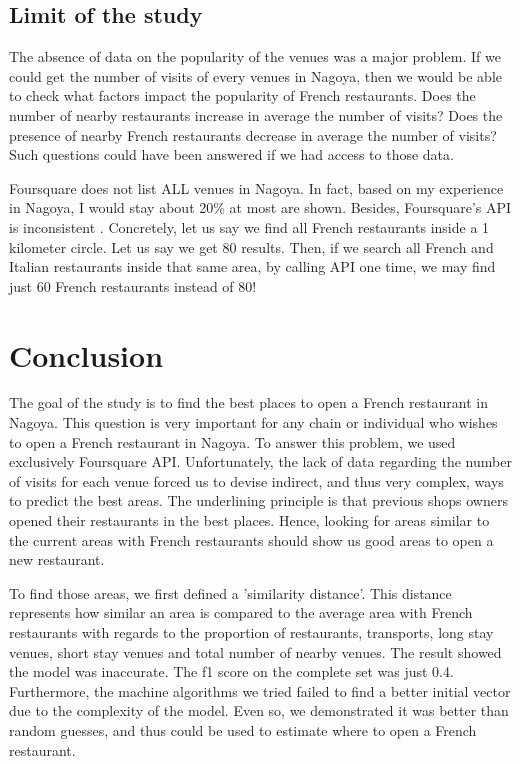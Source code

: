 \documentclass[12pt,a4paper]{article}
\begin{document}
\subsection{Limit of the study}

The absence of data on the popularity of the venues was a major problem. If we could get the number of visits of every venues in Nagoya, then we would be able to check what factors impact the popularity of French restaurants. Does the number of nearby restaurants increase in average the number of visits? Does the presence of nearby French restaurants decrease in average the number of visits? Such questions could have been answered if we had access to those data.

\medskip

Foursquare does not list ALL venues in Nagoya. In fact, based on my experience in Nagoya, I would stay about 20\% at most are shown. Besides, Foursquare's API is inconsistent . Concretely, let us say we find all French restaurants inside a 1 kilometer circle. Let us say we get 80 results. Then, if we search all French and Italian restaurants inside that same area, by calling API one time, we may find just 60 French restaurants instead of 80!

\section{Conclusion}

The goal of the study is to find the best places to open a French restaurant in Nagoya. This question is very important for any chain or individual who wishes to open a French restaurant in Nagoya. To answer this problem, we used exclusively Foursquare API. Unfortunately, the lack of data regarding the number of visits for each venue forced us to devise indirect, and thus very complex, ways to predict the best areas. The underlining principle is that previous shops owners opened their restaurants in the best places. Hence, looking for areas similar to the current areas with French restaurants should show us good areas to open a new restaurant.

\medskip

To find those areas, we first defined a 'similarity distance'. This distance represents how similar an area is compared to the average area with French restaurants with regards to the proportion of restaurants, transports, long stay venues, short stay venues and total number of nearby venues. The result showed the model was inaccurate. The f1 score on the complete set was just 0.4. Furthermore, the machine algorithms we tried failed to find a better initial vector due to the complexity of the model. Even so, we demonstrated it was better than random guesses, and thus could be used to estimate where to open a French restaurant. 
\end{document}
